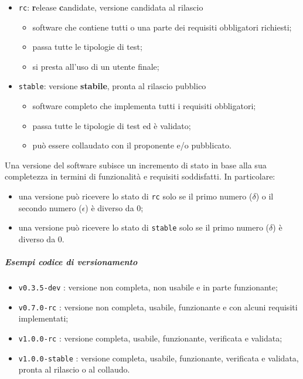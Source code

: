 \begin{itemize}
\begin{itemize}
\begin{itemize}
					\end{itemize}
				\item \verb!rc!: \textbf{r}elease \textbf{c}andidate, versione candidata al rilascio
				\begin{itemize}
					\item software che contiene tutti o una parte dei requisiti obbligatori richiesti;
					\item passa tutte le tipologie di test;
					\item si presta all'uso di un utente finale;
				\end{itemize}
				\item \verb!stable!: versione \textbf{stabile}, pronta al rilascio pubblico
				\begin{itemize}
					\item software completo che implementa tutti i requisiti obbligatori;
					\item passa tutte le tipologie di test ed è validato;
					\item può essere collaudato con il proponente e/o pubblicato.
				\end{itemize}
			\end{itemize}
		\end{itemize}

		Una versione del software subisce un incremento di stato in base alla sua completezza in termini di funzionalità e requisiti soddisfatti. In particolare:
		\begin{itemize}
			\item una versione può ricevere lo stato di \verb!rc! solo se il primo numero (\(\delta\)) o il secondo numero (\(\epsilon\)) è diverso da 0;
			\item una versione può ricevere lo stato di \verb!stable! solo se il primo numero (\(\delta\)) è diverso da 0.
		\end{itemize}

		\subparagraph{Esempi codice di versionamento}

		\begin{itemize}
			\item \verb!v0.3.5-dev! : versione non completa, non usabile e in parte funzionante;
			\item \verb!v0.7.0-rc! : versione non completa, usabile, funzionante e con alcuni requisiti implementati;
			\item \verb!v1.0.0-rc! : versione completa, usabile, funzionante, verificata e validata;
			\item \verb!v1.0.0-stable! : versione completa, usabile, funzionante, verificata e validata, pronta al rilascio o al collaudo.
		\end{itemize}

